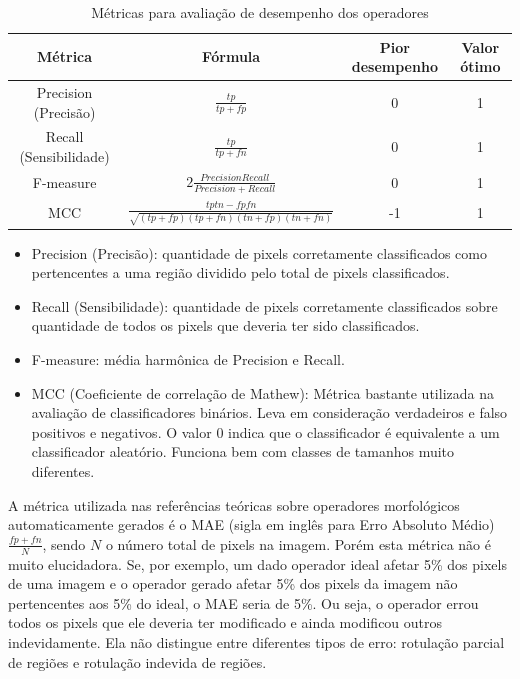 \documentclass[a4paper,11pt]{article}
\begin{document}
  \begin{table}[htb]
    \caption{Métricas para avaliação de desempenho dos operadores}
    \begin{tabular}{ | c | c | c | c | }
      \hline
      Métrica & Fórmula & Pior desempenho & Valor ótimo 
      \\ \hline
      Precision (Precisão) & $\frac{tp}{tp + fp}$ & 0 & 1
      \\ \hline
      Recall (Sensibilidade) & $\frac{tp}{tp + fn}$ & 0 & 1
      \\ \hline
      F-measure & $2 \frac{Precision Recall}{Precision + Recall}$ & 0 & 1
      \\ \hline
      MCC & $\frac{tp tn - fp fn}{\sqrt{(tp + fp)(tp + fn)(tn + fp)(tn + fn)}}$ & -1 & 1
      \\ \hline
    \end{tabular}
    \label{tab:metrics}
  \end{table}

  \begin{itemize}
    \item Precision (Precisão): quantidade de pixels corretamente classificados como pertencentes a uma região dividido pelo total de pixels classificados.
    \item Recall (Sensibilidade): quantidade de pixels corretamente classificados sobre quantidade de todos os pixels que deveria ter sido classificados.
    \item F-measure: média harmônica de Precision e Recall.
    \item MCC (Coeficiente de correlação de Mathew): Métrica bastante utilizada na avaliação de classificadores binários. Leva em consideração verdadeiros e falso positivos e negativos. O valor 0 indica que o classificador é equivalente a um classificador aleatório. Funciona bem com classes de tamanhos muito diferentes.
  \end{itemize}

  A métrica utilizada nas referências teóricas sobre operadores morfológicos automaticamente gerados é o MAE (sigla em inglês para Erro Absoluto Médio) $\frac{fp + fn}{N}$, sendo $N$ o número total de pixels na imagem. Porém esta métrica não é muito elucidadora. Se, por exemplo, um dado operador ideal afetar 5\% dos pixels de uma imagem e o operador gerado afetar 5\% dos pixels da imagem não pertencentes aos 5\% do ideal, o MAE seria de 5\%. Ou seja, o operador errou todos os pixels que ele deveria ter modificado e ainda modificou outros indevidamente. Ela não distingue entre diferentes tipos de erro: rotulação parcial de regiões e rotulação indevida de regiões.
\end{document}
